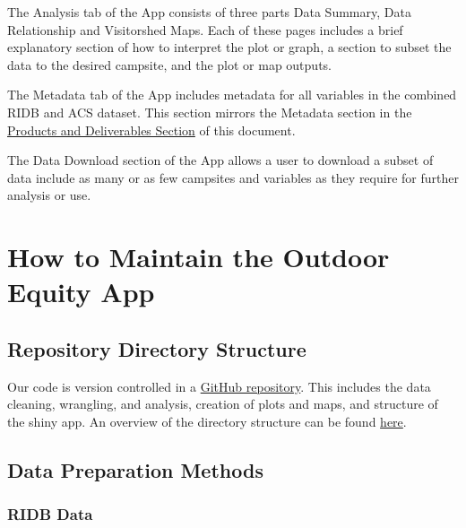 \documentclass[
  11 pt,
  openany]{book}
\begin{document}
The Analysis tab of the App consists of three parts Data Summary, Data Relationship and Visitorshed Maps. Each of these pages includes a brief explanatory section of how to interpret the plot or graph, a section to subset the data to the desired campsite, and the plot or map outputs.

The Metadata tab of the App includes metadata for all variables in the combined RIDB and ACS dataset. This section mirrors the Metadata section in the \protect\hyperlink{products-and-deliverables}{Products and Deliverables Section} of this document.

The Data Download section of the App allows a user to download a subset of data include as many or as few campsites and variables as they require for further analysis or use.

\hypertarget{how-to-maintain-the-outdoor-equity-app}{%
\section{How to Maintain the Outdoor Equity App}\label{how-to-maintain-the-outdoor-equity-app}}

\hypertarget{repository-directory-structure}{%
\subsection{Repository Directory Structure}\label{repository-directory-structure}}

Our code is version controlled in a \href{https://github.com/outdoor-equity/outdoor-equity}{GitHub repository}. This includes the data cleaning, wrangling, and analysis, creation of plots and maps, and structure of the shiny app. An overview of the directory structure can be found \href{}{here}.

\hypertarget{data-preparation-methods}{%
\subsection{Data Preparation Methods}\label{data-preparation-methods}}

\hypertarget{ridb-data}{%
\subsubsection{RIDB Data}\label{ridb-data}}
\end{document}
